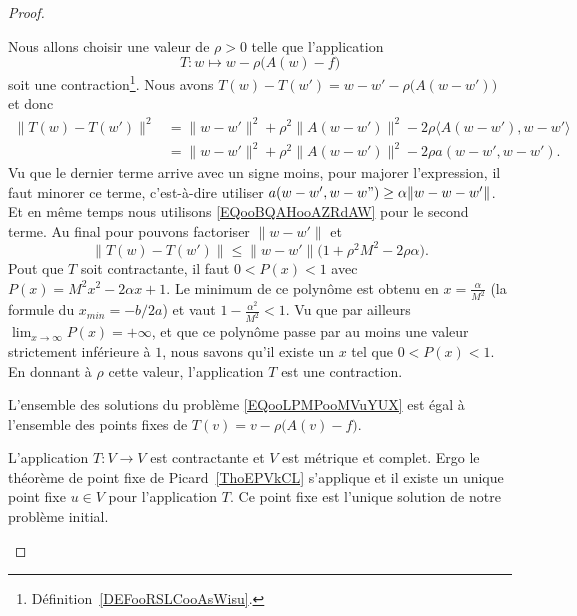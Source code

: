 \begin{proof}
\begin{subproof}
		Nous allons choisir une valeur de \( \rho>0\) telle que l'application
		\begin{equation}
			T\colon w\mapsto w-\rho\big( A(w)-f \big)
		\end{equation}
		soit une contraction\footnote{Définition~\ref{DEFooRSLCooAsWisu}.}. Nous avons \( T(w)-T(w')=w-w'-\rho\big( A(w-w') \big)\) et donc
		\begin{subequations}
			\begin{align}
				\| T(w)-T(w') \|^2 & =\| w-w' \|^2+\rho^2\| A(w-w') \|^2-2\rho\langle A(w-w'), w-w'\rangle \\
				                   & =\| w-w' \|^2+\rho^2\| A(w-w') \|^2-2\rho a(w-w',w-w').
			\end{align}
		\end{subequations}
		Vu que le dernier terme arrive avec un signe moins, pour majorer l'expression, il faut minorer ce terme, c'est-à-dire utiliser \( a(w-w',w-w")\geq \alpha\| w-w-w' \|\). Et en même temps nous utilisons \eqref{EQooBQAHooAZRdAW} pour le second terme. Au final pour pouvons factoriser \( \| w-w' \|\) et
		\begin{equation}
			\| T(w)-T(w') \|\leq \| w-w' \|\big( 1+\rho^2M^2-2\rho\alpha \big).
		\end{equation}
		Pout que \( T\) soit contractante, il faut \( 0<P(x)<1\) avec \( P(x)=M^2x^2-2\alpha x+1\). Le minimum de ce polynôme est obtenu en \( x=\frac{ \alpha }{ M^2 }\) (la formule du \( x_{min}=-b/2a\)) et vaut \( 1-\frac{ \alpha^2 }{ M^2 }<1\). Vu que par ailleurs \( \lim_{x\to \infty} P(x)=+\infty\), et que ce polynôme passe par au moins une valeur strictement inférieure à \( 1\), nous savons qu'il existe un \( x\) tel que \( 0<P(x)<1\). En donnant à \( \rho\) cette valeur, l'application \( T\) est une contraction.

		L'ensemble des solutions du problème \eqref{EQooLPMPooMVuYUX} est égal à l'ensemble des points fixes de \( T(v)=v-\rho\big( A(v)-f \big)\).

		L'application \( T\colon V\to V\) est contractante et \( V\) est métrique et complet. Ergo le théorème de point fixe de Picard~\ref{ThoEPVkCL} s'applique et il existe un unique point fixe \( u\in V\) pour l'application \( T\). Ce point fixe est l'unique solution de notre problème initial.

		\spitem[La majoration]


\end{subproof}
\end{proof}
